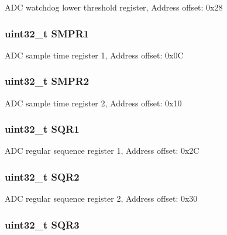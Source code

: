A\-D\-C watchdog lower threshold register, Address offset\-: 0x28 \hypertarget{struct_a_d_c___type_def_af9d6c604e365c7d9d7601bf4ef373498}{
\subsubsection[{S\-M\-P\-R1}]{ uint32\-\_\-t S\-M\-P\-R1}}\label{struct_a_d_c___type_def_af9d6c604e365c7d9d7601bf4ef373498}
A\-D\-C sample time register 1, Address offset\-: 0x0\-C \hypertarget{struct_a_d_c___type_def_a6ac83fae8377c7b7fcae50fa4211b0e8}{
\subsubsection[{S\-M\-P\-R2}]{ uint32\-\_\-t S\-M\-P\-R2}}\label{struct_a_d_c___type_def_a6ac83fae8377c7b7fcae50fa4211b0e8}
A\-D\-C sample time register 2, Address offset\-: 0x10 \hypertarget{struct_a_d_c___type_def_a3302e1bcfdfbbfeb58779d0761fb377c}{
\subsubsection[{S\-Q\-R1}]{ uint32\-\_\-t S\-Q\-R1}}\label{struct_a_d_c___type_def_a3302e1bcfdfbbfeb58779d0761fb377c}
A\-D\-C regular sequence register 1, Address offset\-: 0x2\-C \hypertarget{struct_a_d_c___type_def_aab440b0ad8631f5666dd32768a89cf60}{
\subsubsection[{S\-Q\-R2}]{ uint32\-\_\-t S\-Q\-R2}}\label{struct_a_d_c___type_def_aab440b0ad8631f5666dd32768a89cf60}
A\-D\-C regular sequence register 2, Address offset\-: 0x30 \hypertarget{struct_a_d_c___type_def_a97e40d9928fa25a5628d6442f0aa6c0f}{
\subsubsection[{S\-Q\-R3}]{ uint32\-\_\-t S\-Q\-R3}}\label{struct_a_d_c___type_def_a97e40d9928fa25a5628d6442f0aa6c0f}
